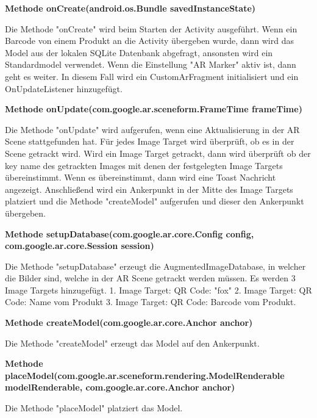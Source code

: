 \documentclass{scrartcl}
\begin{document}
\noindent\textbf{Methode onCreate(android.os.Bundle savedInstanceState)}

\noindent Die Methode "onCreate" wird beim Starten der Activity ausgeführt. Wenn ein Barcode von einem Produkt an die Activity übergeben wurde, dann wird das Model aus der lokalen SQLite Datenbank abgefragt, ansonsten wird ein Standardmodel verwendet. Wenn die Einstellung "AR Marker" aktiv ist, dann geht es weiter. In diesem Fall wird ein CustomArFragment initialisiert und ein OnUpdateListener hinzugefügt. \newline

\noindent\textbf{Methode onUpdate(com.google.ar.sceneform.FrameTime frameTime)}

\noindent Die Methode "onUpdate" wird aufgerufen, wenn eine Aktualisierung in der AR Scene stattgefunden hat. Für jedes Image Target wird überprüft, ob es in der Scene getrackt wird. Wird ein Image Target getrackt, dann wird überprüft ob der key name des getrackten Images mit denen der festgelegten Image Targets übereinstimmt. Wenn es übereinstimmt, dann wird eine Toast Nachricht angezeigt. Anschließend wird ein Ankerpunkt in der Mitte des Image Targets platziert und die Methode "createModel" aufgerufen und dieser den Ankerpunkt übergeben. \newline

\noindent\textbf{Methode setupDatabase(com.google.ar.core.Config config, \newline com.google.ar.core.Session session)}

\noindent Die Methode "setupDatabase" erzeugt die AugmentedImageDatabase, in welcher die Bilder sind, welche in der AR Scene getrackt werden müssen. Es werden 3 Image Targets hinzugefügt. 1. Image Target: QR Code: "fox" 2. Image Target: QR Code: Name vom Produkt 3. Image Target: QR Code: Barcode vom Produkt. \newline

\noindent\textbf{Methode createModel(com.google.ar.core.Anchor anchor)}

\noindent Die Methode "createModel" erzeugt das Model auf den Ankerpunkt. \newline

\noindent\textbf{Methode 	placeModel(com.google.ar.sceneform.rendering.ModelRenderable \newline modelRenderable, com.google.ar.core.Anchor anchor)}

\noindent Die Methode "placeModel" platziert das Model. \newline
\end{document}

